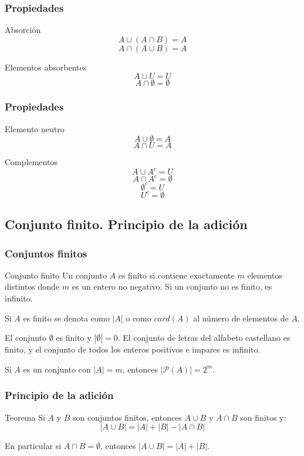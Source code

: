 \documentclass{beamer}
\begin{document}
\begin{frame}
\frametitle{Propiedades}
\begin{block}{Absorci\'on}
\[A\cup (A \cap B) = A\]
\[A\cap (A \cup B) = A\]
\end{block}

\begin{block}{Elementos absorbentes}
\[A\cup U = U\]
\[A\cap \emptyset = \emptyset\]
\end{block}

\end{frame}




\begin{frame}
\frametitle{Propiedades}
\begin{block}{Elemento neutro}
\[A\cup \emptyset = A\]
\[A\cap U = A\]
\end{block}

\begin{block}{Complementos}
\[A\cup A^c = U\]
\[A\cap A^c = \emptyset\]
\[ \emptyset^c = U\]
\[ U^c = \emptyset\]
\end{block}

\end{frame}



\subsection{Conjunto finito. Principio de la adici\'on}

\begin{frame}
\frametitle{Conjuntos finitos}
\begin{block}{Conjunto finito}
Un conjunto $A$ es finito si contiene exactamente $m$ elementos distintos donde $m$ es un entero no negativo. Si un conjunto no es finito, es infinito.


Si $A$ es finito se denota como $|A|$ o como $card(A)$ al n\'umero de elementos de $A$.
\end{block}

El conjunto $\emptyset$ es finito y $|\emptyset | = 0$. El conjunto de letras del alfabeto castellano es finito, y el conjunto de todos los enteros positivos e impares es infinito.

Si $A$ es un conjunto con $|A|=m$, entonces $|\mathcal{P}(A)| = 2^m$.

\end{frame}



\begin{frame}
\frametitle{Principio de la adici\'on}
\begin{block}{Teorema}
Si $A$ y $B$ son conjuntos finitos, entonces $A\cup B$ y $A\cap B$ son finitos y:
\[|A\cup B | = |A| + |B| - |A\cap B|\]
\end{block}
En particular si $A\cap B = \emptyset$, entonces $|A\cup B| = |A|+|B|$.
\end{frame}
\end{document}
